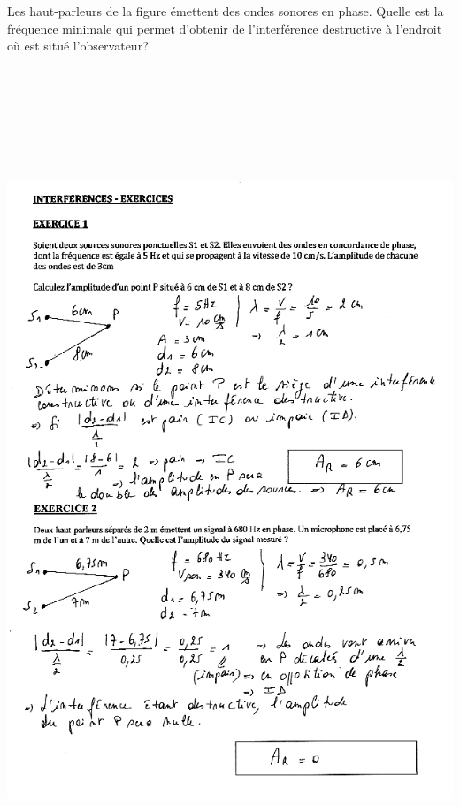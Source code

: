 Les haut-parleurs de la figure émettent des ondes sonores en phase.
Quelle est la fréquence minimale qui permet d'obtenir de l'interférence
destructive à l'endroit où est situé l'observateur?

\includegraphics[width=18.253cm,height=25.273cm]{Pictures/100000010000027000000360A2E9B52B5C1C825B.png}

